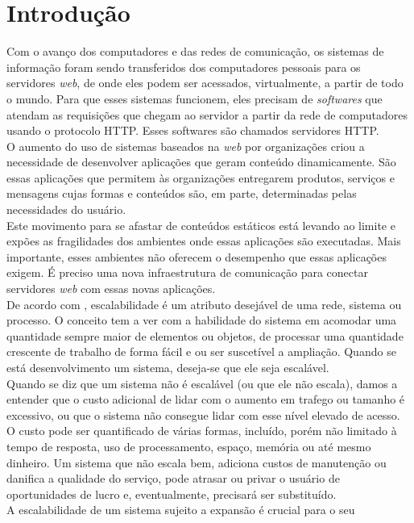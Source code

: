 \chapter{Introdução}\label{cap:introducao}
Com o avanço dos computadores e das redes de comunicação, os sistemas de 
informação foram sendo transferidos dos computadores pessoais para os 
servidores \textit{web}, de onde eles podem ser acessados, virtualmente, a 
partir de todo o mundo. Para que esses sistemas funcionem, eles precisam de 
\textit{softwares} que atendam as requisições que chegam ao servidor a partir 
da rede de computadores usando o protocolo HTTP. Esses softwares são chamados 
servidores HTTP.\\
O aumento do uso de sistemas baseados na \textit{web} por organizações criou a 
necessidade de desenvolver aplicações que geram conteúdo dinamicamente. São 
essas aplicações que permitem às organizações entregarem produtos, serviços e 
mensagens cujas formas e conteúdos são, em parte, determinadas pelas 
necessidades do usuário.\\
Este movimento para se afastar de conteúdos estáticos está levando ao limite e 
expões as fragilidades dos ambientes onde essas aplicações são 
executadas. Mais importante, esses ambientes não oferecem o desempenho que 
essas aplicações exigem. É preciso uma nova infraestrutura de comunicação para 
conectar servidores \textit{web} com essas novas aplicações.\\
De acordo com , escalabilidade é um atributo desejável de 
uma rede, sistema ou processo. O conceito tem a ver com a habilidade do sistema 
em acomodar uma quantidade sempre maior de elementos ou objetos, de processar 
uma quantidade crescente de trabalho de forma fácil e ou ser suscetível a 
ampliação. Quando se está desenvolvimento um sistema, deseja-se que 
ele seja escalável.\\
Quando se diz que um sistema não é escalável (ou que ele não escala), damos a 
entender que o custo adicional de lidar com o aumento em trafego ou tamanho é 
excessivo, ou que o sistema não consegue lidar com esse nível elevado de 
acesso. O custo pode ser quantificado de várias formas, incluído, porém não 
limitado à tempo de resposta, uso de processamento, espaço, memória ou até 
mesmo dinheiro. Um sistema que não escala bem, adiciona custos de manutenção ou 
danifica a qualidade do serviço, pode atrasar ou privar o usuário de 
oportunidades de lucro e, eventualmente, precisará ser substituído.\\
A escalabilidade de um sistema sujeito a expansão é crucial para o seu 
